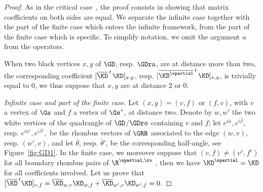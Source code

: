 \documentclass[a4paper,twoside,11pt]{article}
\begin{document}
\begin{proof}
As in the critical case~\cite{Kenyon3}, the proof consists in showing that matrix coefficients on both sides are equal.
We separate the infinite case together with the part of the finite case which enters 
the infinite framework, from the part of the finite case which is specific. To simplify notation,
we omit the argument $u$ from the operators.

When two black vertices $x,y$ of $\GD$, resp. $\GDro$, are at distance more than two, the corresponding coefficient
$[\overline{\KD}^{\,t\,}\KD]_{x,y}$, resp. $[\overline{\KD^\spartial}^{\,t\,}\KD]_{x,y}$, is trivially equal to 0, we thus suppose that
$x,y$ are at distance 2 or 0. 

\emph{Infinite case and part of the finite case}.
Let $(x,y)=(v,f)$ or $(f,v)$, with $v$ a vertex of $\Gs$ and $f$ a vertex of $\Gs^*$, at distance two. Denote by $w,w'$ the two white vertices of the quadrangle
of $\GD$/$\GDro$ containing $v$ and $f$; let $e^{i\bar{\alpha}},e^{i\bar{\beta}},$ resp. 
$e^{i\bar{\alpha}'},e^{i\bar{\beta}'},$ be the rhombus vectors of $\GRR$ associated to the edge $(w,v)$, resp. $(w',v)$, and 
let $\bar{\theta}$, resp. $\bar{\theta}'$, be the corresponding half-angle, see Figure~\ref{fig:GD1}.
In the finite case, we moreover suppose that 
$(v,f)\neq (v^c,f^c)$ for all boundary rhombus pairs of $\R^{\spartial,\rs}$
, then we have $\KD^\spartial=\KD$ for all coefficients involved. Let us prove that 
$[\overline{\KD}^{\,t}\KD]_{v,f}=\overline{\KD}_{w,v}\KD_{w,f}+\overline{\KD}_{w',v}\KD_{w',f}=0$.


\end{proof}
\end{document}
